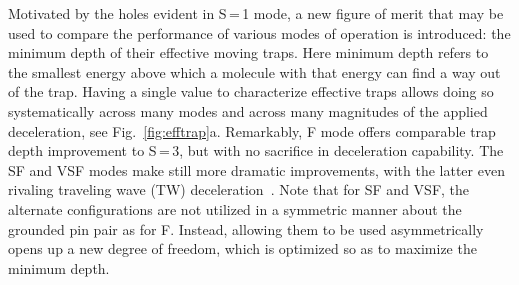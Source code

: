 Motivated by the holes evident in S\,=\,1 mode, a new figure of merit that may be used to compare the performance of various modes of operation is introduced: the minimum depth of their effective moving traps.
Here minimum depth refers to the smallest energy above which a molecule with that energy can find a way out of the trap.
Having a single value to characterize effective traps allows doing so systematically across many modes and across many magnitudes of the applied deceleration, see Fig.~\ref{fig:efftrap}a. Remarkably, F mode offers comparable trap depth improvement to S\,=\,3, but with no sacrifice in deceleration capability. 
The SF and VSF modes make still more dramatic improvements, with the latter even rivaling traveling wave (TW) deceleration~\cite{Osterwalder2010}. 
Note that for SF and VSF, the alternate configurations are not utilized in a symmetric manner about the grounded pin pair as for F. 
Instead, allowing them to be used asymmetrically opens up a new degree of freedom, which is optimized so as to maximize the minimum depth.


